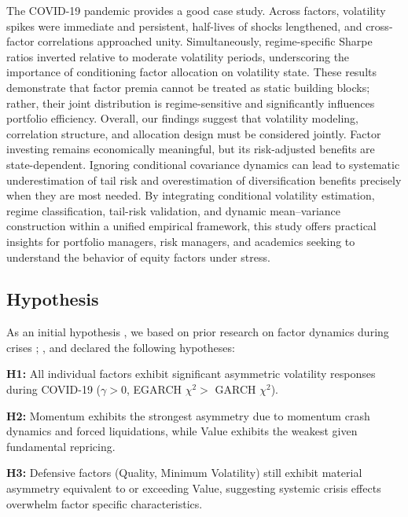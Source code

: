 \documentclass{article}
\begin{document}
The COVID-19 pandemic provides a good case study. Across factors, volatility spikes were immediate and persistent, half-lives of shocks lengthened, and cross-factor correlations approached unity. Simultaneously, regime-specific Sharpe ratios inverted relative to moderate volatility periods, underscoring the importance of conditioning factor allocation on volatility state. These results demonstrate that factor premia cannot be treated as static building blocks; rather, their joint distribution is regime-sensitive and significantly influences portfolio efficiency. Overall, our findings suggest that volatility modeling, correlation structure, and allocation design must be considered jointly. Factor investing remains economically meaningful, but its risk-adjusted benefits are state-dependent. Ignoring conditional covariance dynamics can lead to systematic underestimation of tail risk and overestimation of diversification benefits precisely when they are most needed. By integrating conditional volatility estimation, regime classification, tail-risk validation, and dynamic mean–variance construction within a unified empirical framework, this study offers practical insights for portfolio managers, risk managers, and academics seeking to understand the behavior of equity factors under stress.\newline

\subsection{Hypothesis}

As an initial hypothesis , we based on prior research on factor dynamics during crises \cite{novymarx2016}; \cite{blitz2020}, and declared the following hypotheses:\newline

\noindent\textbf{H1:} All individual factors exhibit significant asymmetric volatility responses during COVID-19 ($\gamma > 0$, EGARCH $\chi^2 >$ GARCH $\chi^2$).\newline

\noindent\textbf{H2:} Momentum exhibits the strongest asymmetry due to momentum crash dynamics and forced liquidations, while Value exhibits the weakest given fundamental repricing.\newline

\noindent\textbf{H3:} Defensive factors (Quality, Minimum Volatility) still exhibit material asymmetry equivalent to or exceeding Value, suggesting systemic crisis effects overwhelm factor specific characteristics.\newline
\end{document}
